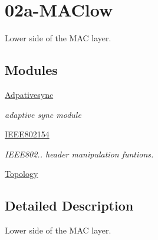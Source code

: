 \hypertarget{group___m_a_clow}{}\section{02a-\/\+M\+A\+Clow}
\label{group___m_a_clow}


Lower side of the M\+AC layer.  


\subsection*{Modules}
\begin{DoxyCompactItemize}
\item 
\hyperlink{group__adpativesync}{Adpativesync}
\begin{DoxyCompactList}\small\item\em adaptive sync module \end{DoxyCompactList}\item 
\hyperlink{group___i_e_e_e802154}{I\+E\+E\+E802154}
\begin{DoxyCompactList}\small\item\em I\+E\+E\+E802.. header manipulation funtions. \end{DoxyCompactList}\item 
\hyperlink{group__topology}{Topology}
\end{DoxyCompactItemize}


\subsection{Detailed Description}
Lower side of the M\+AC layer. 

